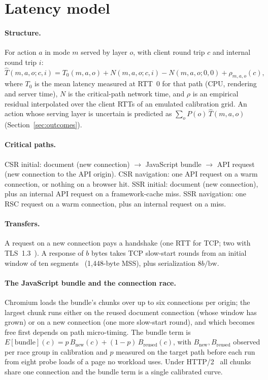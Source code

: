 \documentclass[acmsmall,review,nonacm]{acmart}
\begin{document}
\section{Latency model}
\label{sec:model}

\paragraph{Structure.}
For action $a$ in mode $m$ served by layer $o$, with client round trip $c$ and internal round trip $i$:
\begin{equation}
\hat T(m,a,o;c,i) = T_0(m,a,o) + N(m,a,o;c,i) - N(m,a,o;0,0) + \rho_{m,a,o}(c),
\label{eq:model}
\end{equation}
where $T_0$ is the mean latency measured at RTT~0 for that path (CPU, rendering and server time), $N$ is the critical-path network time, and $\rho$ is an empirical residual interpolated over the client RTTs of an emulated calibration grid. An action whose serving layer is uncertain is predicted as $\sum_o P(o)\,\hat T(m,a,o)$ (Section~\ref{sec:outcomes}).

\paragraph{Critical paths.}
CSR initial: document (new connection) $\rightarrow$ JavaScript bundle $\rightarrow$ API request (new connection to the API origin). CSR navigation: one API request on a warm connection, or nothing on a browser hit. SSR initial: document (new connection), plus an internal API request on a framework-cache miss. SSR navigation: one RSC request on a warm connection, plus an internal request on a miss.

\paragraph{Transfers.}
A request on a new connection pays a handshake (one RTT for TCP; two with TLS~1.3~\cite{rfc8446}). A response of $b$ bytes takes TCP slow-start rounds from an initial window of ten segments~\cite{rfc6928} (1{,}448-byte MSS), plus serialization $8b/\text{bw}$.

\paragraph{The JavaScript bundle and the connection race.}
Chromium loads the bundle's chunks over up to six connections per origin; the largest chunk runs either on the reused document connection (whose window has grown) or on a new connection (one more slow-start round), and which becomes free first depends on path micro-timing. The bundle term is $E[\text{bundle}](c) = p\,B_{\text{new}}(c) + (1-p)\,B_{\text{reused}}(c)$, with $B_{\text{new}}, B_{\text{reused}}$ observed per race group in calibration and $p$ measured on the target path before each run from eight probe loads of a page no workload uses. Under HTTP/2~\cite{rfc9113} all chunks share one connection and the bundle term is a single calibrated curve.
\end{document}
